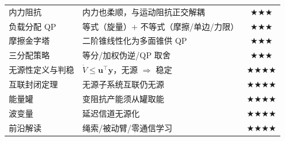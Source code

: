 \begin{table}[H]
\begin{tabular}{p{4.6cm}p{7.0cm}c}
内力阻抗 & 内力也柔顺，与运动阻抗正交解耦 & $\bigstar\bigstar\bigstar$ \\
负载分配 QP & 等式（旋量）$+$ 不等式（摩擦/单边/力限） & $\bigstar\bigstar\bigstar$ \\
摩擦金字塔 & 二阶锥线性化为多面锥供 QP & $\bigstar\bigstar\bigstar$ \\
三分配策略 & 等分/加权伪逆/QP 取舍 & $\bigstar\bigstar\bigstar$ \\
无源性定义与判稳 & $\dot V\le\mathbf{u}^\top\mathbf{y}$，无源 $\Rightarrow$ 稳定 & $\bigstar\bigstar\bigstar\bigstar$ \\
互联封闭定理 & 无源子系统互联仍无源 & $\bigstar\bigstar\bigstar\bigstar$ \\
能量罐 & 变阻抗产能须从罐取能 & $\bigstar\bigstar\bigstar\bigstar$ \\
波变量 & 延迟信道无源化 & $\bigstar\bigstar\bigstar\bigstar$ \\
前沿解读 & 绳索/被动臂/零通信学习 & $\bigstar\bigstar\bigstar\bigstar$ \\
\bottomrule
\end{tabular}
\end{table}

